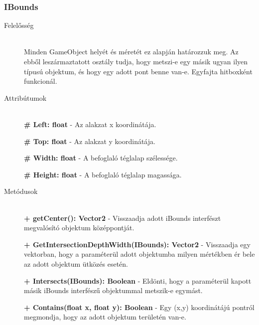 \subsubsection{IBounds}
	\begin{description}
		\item[Felelősség] \hfill \\
		 Minden GameObject helyét és méretét ez alapján határozzuk meg. Az ebből leszármaztatott osztály tudja, hogy metszi-e egy másik ugyan ilyen típusú objektum, és hogy egy adott pont benne van-e. Egyfajta hitboxként funkcionál. 
		 
		\item[Attribútumok]\hfill \\
		\textbf{\# Left: float} - Az alakzat x koordinátája.
		
		\textbf{\# Top: float} - Az alakzat y koordinátája.
		
		\textbf{\# Width: float} - A befoglaló téglalap szélessége.
		
		\textbf{\# Height: float} - A befoglaló téglalap magassága.
		
		\item[Metódusok]\hfill \\
		\textbf{+ getCenter(): Vector2} - Visszaadja adott iBounds interfészt megvalósító objektum középpontját.
		
		\textbf{+ GetIntersectionDepthWidth(IBounds): Vector2} - Visszaadja egy vektorban, hogy a paraméterül adott objektumba milyen mértékben ér bele az adott objektum ütközés esetén.
		
		\textbf{+ Intersects(IBounds): Boolean} - Eldönti, hogy a paraméterül kapott másik iBounds interfészű objektummal metszik-e egymást.
		
		\textbf{+ Contains(float x, float y): Boolean} - Egy (x,y) koordinátájú pontról megmondja, hogy az adott objektum területén van-e.
								
	\end{description}
	
